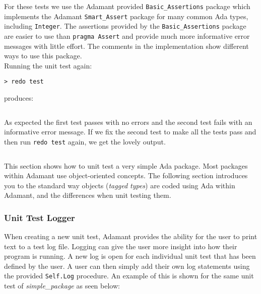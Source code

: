 For these tests we use the Adamant provided \texttt{Basic\_Assertions} package which implements the Adamant \texttt{Smart\_Assert} package for many common Ada types, including \texttt{Integer}. The assertions provided by the \texttt{Basic\_Assertions} package are easier to use than \texttt{pragma Assert} and provide much more informative error messages with little effort. The comments in the implementation show different ways to use this package. \\

Running the unit test again:

\vspace{5mm} %
\begin{verbatim}
> redo test
\end{verbatim}
\vspace{5mm} %

produces:

\vspace{5mm} %
\inputminted{text}{../example_architecture/simple_package/test_better2/output.txt}
\vspace{5mm} %

As expected the first test passes with no errors and the second test fails with an informative error message. If we fix the second test to make all the tests pass and then run \texttt{redo test} again, we get the lovely output.

\vspace{5mm} %
\inputminted{text}{../example_architecture/simple_package/test_better3/output.txt}
\vspace{5mm} %

This section shows how to unit test a very simple Ada package. Most packages within Adamant use object-oriented concepts. The following section introduces you to the standard way objects (\textit{tagged types}) are coded using Ada within Adamant, and the differences when unit testing them.

\subsubsection{Unit Test Logger} \label{Unit Test Logger}

When creating a new unit test, Adamant provides the ability for the user to print text to a test log file. Logging can give the user more insight into how their program is running. A new log is open for each individual unit test that has been defined by the user. A user can then simply add their own log statements using the provided \texttt{Self.Log} procedure. An example of this is shown for the same unit test of \textit{simple\_package} as seen below: \\

